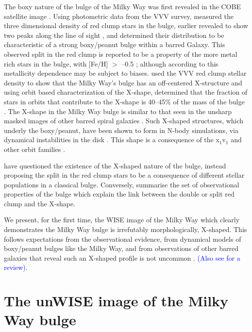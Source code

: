 \documentclass[12pt, preprint]{aastex}
\begin{document}
The boxy nature of the bulge of the Milky Way was first revealed in
the COBE satellite image \citep{Dwek1995}. Using photometric data from
the VVV survey, \citet{Wegg2013} measured the three dimensional
density of red clump stars in the bulge, earlier revealed to show two
peaks along the line of sight \citep{McWilliam2010, Nataf2010}, and
determined their distribution to be characteristic of a strong
boxy/peanut bulge within a barred Galaxy. This observed split in the
red clump is reported to be a property of the more metal rich stars in
the bulge, with [Fe/H] $>$ --0.5 \citep{Ness2012, Uttenthaler2012};
although according to \citet{Nataf2014} this metallicity dependence
may be subject to biases.  \citet{Portail2015a} used the VVV red clump
stellar density to show that the Milky Way's bulge has an off-centered
X-structure and using orbit based characterization of the
X-shape, determined that the fraction of stars in orbits that
contribute to the X-shape is 40--45\% of the mass of the bulge
\citep{Portail2015b}. The X-shape in the Milky Way bulge is similar to
that seen in the unsharp masked images of other barred spiral galaxies
\citep[e.g.][]{Bureau2006}. Such X-shaped structures, which underly
the boxy/peanut, have been shown to form in N-body simulations, via
dynamical instabilities in the disk \citep[e.g.][]{Athanassoula2005,
  Debattista2006, Inma2006}. This shape is a consequence of the
x$_{1}$v$_{1}$ \citep{P1984, Athanassoula1992} and other orbit
families \citep[e.g.][]{Portail2015b}.

\citet{Lee2015} have questioned the existence of the X-shaped nature of the bulge, instead proposing the split in the red clump stars to be a consequence of different stellar populations in a classical bulge. Conversely,  \citet{Gonzalez2015} summarise the set of observational properties of the bulge which explain the link between the double or split red clump and the X-shape.


 We present, for the first time, the WISE image of the Milky Way \citep{Lang2014a, Meisner2016} which clearly demonstrates the Milky Way bulge is irrefutably morphologically, X-shaped. This follows expectations from the observational evidence,  from dynamical models of boxy/peanut bulges like the Milky Way, and from observations of other barred galaxies that reveal such an X-shaped profile is not uncommon \citep{L2014}. \textcolor{blue}{(Also see \citet{Athanassoula2016} for a review)}.

\section{The unWISE image of the Milky Way bulge}
\end{document}
